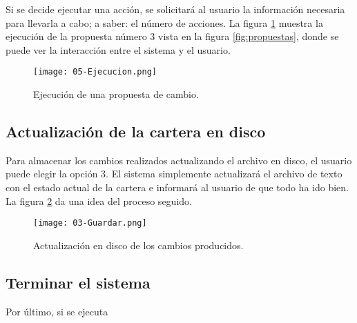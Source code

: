 \documentclass[a4paper, 11pt, titlepage]{article}
\begin{document}
    Si se decide ejecutar una acción, se solicitará al usuario la información necesaria para llevarla a cabo; a saber: el número de acciones. La figura \ref{fig:ejecucion} muestra la ejecución de la propuesta número 3 vista en la figura \ref{fig:propuestas}, donde se puede ver la interacción entre el sistema y el usuario.

    \begin{center}
        \begin{figure}[!htb]
            \centering
            \texttt{[image: 05-Ejecucion.png]}
            \caption{Ejecución de una propuesta de cambio.}
            \label{fig:ejecucion}
        \end{figure}
    \end{center}



    \subsection{Actualización de la cartera en disco}

    Para almacenar los cambios realizados actualizando el archivo en disco, el usuario puede elegir la opción 3. El sistema simplemente actualizará el archivo de texto con el estado actual de la cartera e informará al usuario de que todo ha ido bien. La figura \ref{fig:guardar} da una idea del proceso seguido.

    \begin{center}
        \begin{figure}[!htb]
            \centering
            \texttt{[image: 03-Guardar.png]}
            \caption{Actualización en disco de los cambios producidos.}
            \label{fig:guardar}
        \end{figure}
    \end{center}


    \subsection{Terminar el sistema}

    Por último, si se ejecuta
\end{document}
